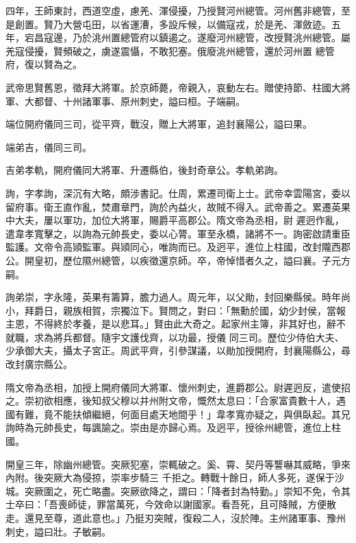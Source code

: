 \begin{pinyinscope}
 四年，王師東討，西道空虛，慮羌、渾侵擾，乃授賢河州總管。河州舊非總管，至是創置。賢乃大營屯田，以省運漕，多設斥候，以備寇戎，於是羌、渾斂迹。五年，宕昌寇邊，乃於洮州置總管府以鎮遏之。遂廢河州總管，改授賢洮州總管。屬羌寇侵擾，賢頻破之，虜遂震懾，不敢犯塞。俄廢洮州總管，還於河州置
 總管府，復以賢為之。



 武帝思賢舊恩，徵拜大將軍。於京師薨，帝親入，哀動左右。贈使持節、柱國大將軍、大都督、十州諸軍事、原州刺史，謚曰桓。子端嗣。



 端位開府儀同三司，從平齊，戰沒，贈上大將軍，追封襄陽公，謚曰果。



 端弟吉，儀同三司。



 吉弟孝軌，開府儀同大將軍、升遷縣伯，後封奇章公。孝軌弟詢。



 詢，字孝詢，深沉有大略，頗涉書記。仕周，累遷司衛上士。武帝幸雲陽宮，委以留府事。衛王直作亂，焚肅章門，詢於內益火，故賊不得入。武帝善之。累遷英果中大夫，屢以軍功，加位大將軍，賜爵平高郡公。隋文帝為丞相，尉
 遲迥作亂，遣韋孝寬擊之，以詢為元帥長史，委以心膂。軍至永橋，諸將不一。詢密啟請重臣監護。文帝令高熲監軍。與熲同心，唯詢而已。及迥平，進位上柱國，改封隴西郡公。開皇初，歷位隰州總管，以疾徵還京師。卒，帝悼惜者久之，謚曰襄。子元方嗣。



 詢弟崇，字永隆，英果有籌算，膽力過人。周元年，以父勛，封回樂縣侯。時年尚小，拜爵日，親族相賀，宗獨泣下。賢問之，對曰：「無勳於國，幼少封侯，當報主恩，不得終於孝養，是以悲耳。」賢由此大奇之。起家州主簿，非其好也，辭不就職，求為將兵都督。隨宇文護伐齊，以功最，授儀
 同三司。歷位少侍伯大夫、少承御大夫，攝太子宮正。周武平齊，引參謀議，以勛加授開府，封襄陽縣公，尋改封廣宗縣公。



 隋文帝為丞相，加授上開府儀同大將軍、懷州刺史，進爵郡公。尉遲迥反，遣使招之。崇初欲相應，後知叔父穆以并州附文帝，慨然太息曰：「合家富貴數十人，遇國有難，竟不能扶傾繼絕，何面目處天地間乎！」韋孝寬亦疑之，與俱臥起。其兄詢時為元帥長史，每諷諭之。崇由是亦歸心焉。及迥平，授徐州總管，進位上柱國。



 開皇三年，除幽州總管。突厥犯塞，崇輒破之。奚、霄、契丹等讋嚇其威略，爭來內附。後突厥大為侵掠，崇率步騎三
 千拒之。轉戰十餘日，師人多死，遂保于沙城。突厥圍之，死亡略盡。突厥欲降之，謂曰：「降者封為特勤。」崇知不免，令其士卒曰：「吾喪師徒，罪當萬死，今效命以謝國家。看吾死，且可降賊，方便散走。還見至尊，道此意也。」乃挺刃突賊，復殺二人，沒於陣。主州諸軍事、豫州刺史，謚曰壯。子敏嗣。




\end{pinyinscope}
